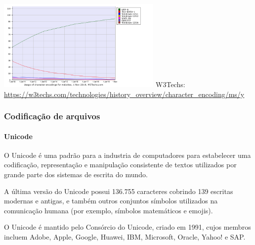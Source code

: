 \begin{frame}[allowframebreaks]
  {
  \centering
  \includegraphics[width=0.6\textwidth]{figures/w3usage.png}
  }
  \footnotesize{W3Techs: \url{https://w3techs.com/technologies/history_overview/character_encoding/ms/y}}
\end{frame}


\begin{frame}
\frametitle{Codificação de arquivos}
\framesubtitle{Unicode}
  O Unicode é uma padrão para a industria de computadores para estabelecer uma 
  codificação, representação e manipulação consistente de textos utilizados por grande parte dos
  sistemas de escrita do mundo.

  A última versão do Unicode possui 136.755 caracteres cobrindo 139 escritas modernas e antigas, 
  e também outros conjuntos símbolos utilizados na comunicação humana (por exemplo, símbolos matemáticos
  e emojis).

  O Unicode é mantido pelo Consórcio do Unicode, criado em 1991, cujos membros incluem Adobe, Apple, Google, Huawei, IBM,
  Microsoft, Oracle, Yahoo! e SAP.
\end{frame}


